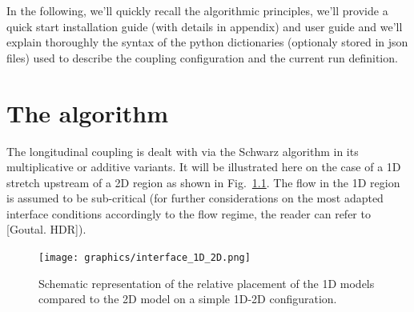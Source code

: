 In the following, we'll quickly recall the algorithmic principles,
we'll provide a quick start installation guide (with details in
appendix) and user guide and we'll explain thoroughly the syntax of
the python dictionaries (optionaly stored in json files) used to
describe the coupling configuration and the
current run definition.

\chapter{The algorithm}\label{algo}

The longitudinal coupling is dealt with via the Schwarz
algorithm in its multiplicative or additive variants. It will be
illustrated here on the case of a 1D stretch
upstream of a 2D region as shown in
Fig.~\ref{fig:interface_1D_2D}. The flow in the 1D region is assumed
to be sub-critical (for further considerations on the most adapted
interface
conditions accordingly to the flow regime, the reader can refer to
[Goutal. HDR]).
\begin{figure}[htbp]
    \centering
    \texttt{[image: graphics/interface\_1D\_2D.png]}
    \caption{Schematic representation of the relative placement of the
      1D models compared to the 2D model on a simple 1D-2D
      configuration.}\label{fig:interface_1D_2D}
\end{figure}

